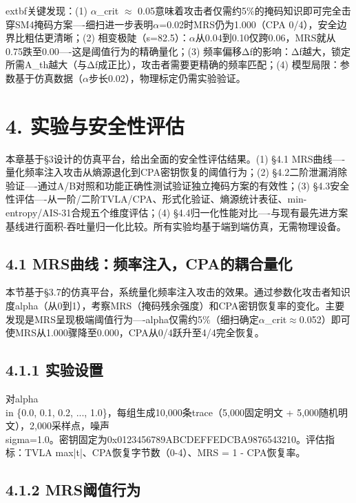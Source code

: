 \documentclass[journal]{IEEEtran}
\begin{document}
	extbf{关键发现}：(1) $\alpha$\_crit $\approx$ 0.05意味着攻击者仅需约5\%的掩码知识即可完全击穿SM4掩码方案----细扫进一步表明$\alpha$=0.02时MRS仍为1.000（CPA 0/4），安全边界比粗估更清晰；(2) 相变极陡（s=82.5）：$\alpha$从0.04到0.10仅跨0.06，MRS就从0.75跌至0.00----这是阈值行为的精确量化；(3) 频率偏移Δf的影响：Δf越大，锁定所需A\_th越大（与Δf成正比），攻击者需要更精确的频率匹配；(4) 模型局限：参数基于仿真数据（$\alpha$步长0.02），物理标定仍需实验验证。

%


\section{4. 实验与安全性评估}

本章基于§3设计的仿真平台，给出全面的安全性评估结果。(1) §4.1 MRS曲线----量化频率注入攻击从熵源退化到CPA密钥恢复的阈值行为；(2) §4.2二阶泄漏消除验证----通过A/B对照和功能正确性测试验证独立掩码方案的有效性；(3) §4.3安全性评估----从一阶/二阶TVLA/CPA、形式化验证、熵源统计表征、min-entropy/AIS-31合规五个维度评估；(4) §4.4归一化性能对比----与现有最先进方案基线进行面积-吞吐量归一化比较。所有实验均基于端到端仿真，无需物理设备。

\subsection{4.1 MRS曲线：频率注入，CPA的耦合量化}

本节基于§3.7的仿真平台，系统量化频率注入攻击的效果。通过参数化攻击者知识度alpha（从0到1），考察MRS（掩码残余强度）和CPA密钥恢复率的变化。主要发现是MRS呈现极端阈值行为----alpha仅需约5\%（细扫确定$\alpha$\_crit$\approx$0.052）即可使MRS从1.000骤降至0.000，CPA从0/4跃升至4/4完全恢复。

\subsection{4.1.1 实验设置}

对alpha \\in \{0.0, 0.1, 0.2, ..., 1.0\}，每组生成10,000条trace（5,000固定明文 + 5,000随机明文），2,000采样点，噪声\\sigma=1.0。密钥固定为0x0123456789ABCDEFFEDCBA9876543210。评估指标：TVLA max|t|、CPA恢复字节数（0-4）、MRS = 1 - CPA恢复率。

\subsection{4.1.2 MRS阈值行为}
\end{document}
